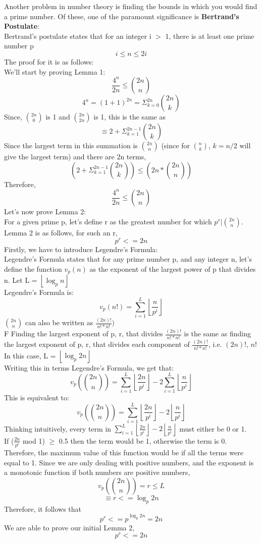 \documentclass[12pt, letterpaper]{article}
\begin{document}
Another problem in number theory is finding the bounds in which you would find a prime number. Of these, one of the paramount significance is \textbf{Bertrand's Postulate}: \\
Bertrand's postulate states that for an integer i $>$ 1, there is at least one prime number p
\[
    i \leq n \leq 2i 
\]
The proof for it is as follows:\\
We'll start by proving Lemma 1:\\
\[
    \frac{4^n}{2n} \leq {2n \choose n}
\]
\[
    4^n = (1 + 1)^{2n} = \Sigma_{k = 0}^{2n} {2n \choose k} 
\]
Since, $2n \choose 0$ is 1 and $2n \choose 2n$ is 1, this is the same as
\[
    \equiv 2 + \Sigma_{k = 1}^{2n - 1} {2n \choose k} 
\]
Since the largest term in this summation is $2n \choose n$ (since for $n \choose k$, $k = n/2$ will give the largest term) and there are 2n terms, 
\[
     (2 + \Sigma_{k = 1}^{2n - 1} {2n \choose k}) \leq (2n * {2n \choose n})
\]
Therefore, 
\[
    \frac{4^n}{2n} \leq {2n \choose n}
\]
Let's now prove Lemma 2:\\
For a given prime p, let's define r as the greatest number for which $p^r | {2n \choose n}$. Lemma 2 is as follows, for such an r, 
\[
    p^r <= 2n
\]
Firstly, we have to introduce Legendre's Formula:\\
Legendre's Formula states that for any prime number p, and any integer n, let's define the function $v_p(n)$ as the exponent of the largest power of p that divides n. Let L = $\left\lfloor \log_{p}{n} \right\rfloor$\\
Legendre's Formula is:
\[
    v_{p}(n!) = \sum_{i = 1}^{L} {\left\lfloor \frac{n}{p^i} \right\rfloor}
\]
${2n \choose n}$ can also be written as $\frac{(2n)!}{n!*n!})$\\F
Finding the largest exponent of p, r, that divides $\frac{(2n)!}{n!*n!}$ is the same as finding the largest exponent of p, r, that divides each component of $\frac{(2n)!}{n!*n!}$, i.e. $(2n)!$, $n!$\\

In this case, L = $\left\lfloor \log_{p}{2n} \right\rfloor$\\ Writing this in terms Legendre's Formula, we get that:
\[
    v_{p}({2n \choose n}) = \sum_{i = 1}^{L} {\left\lfloor \frac{2n}{p^i} \right\rfloor} - 2\sum_{i = 1}^{L} {\left\lfloor \frac{n}{p^i} \right\rfloor}
\]
This is equivalent to:
\[
    v_{p}({2n \choose n}) = \sum_{i = 1}^{L} {\left\lfloor \frac{2n}{p^i} \right\rfloor - 2\left\lfloor \frac{n}{p^i} \right\rfloor}
\]
Thinking intuitively, every term in $\sum_{i = 1}^{L} {\left\lfloor \frac{2n}{p^i} \right\rfloor - 2\left\lfloor \frac{n}{p^i} \right\rfloor}$ must either be 0 or 1.\\
If ($\frac{2n}{p^i}$ mod 1) $\geq$ 0.5 then the term would be 1, otherwise the term is 0. Therefore, the maximum value of this function would be if all the terms were equal to 1. Since we are only dealing with positive numbers, and the exponent is a monotonic function if both numbers are positive numbers,
\[
    v_{p}({2n \choose n}) = r \leq L
\]
\[
    \equiv r <= \log_{p}{2n}
\]
Therefore, it follows that
\[
    p^r <= p^{\log_{p}{2n}} = 2n
\]
We are able to prove our initial Lemma 2, 
\[
    p^r <= 2n
\]
\end{document}
